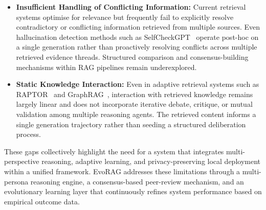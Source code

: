 \begin{itemize}
    \item \textbf{Insufficient Handling of Conflicting Information:}
    Current retrieval systems optimise for relevance but frequently fail to explicitly
    resolve contradictory or conflicting information retrieved from multiple sources.
    Even hallucination detection methods such as SelfCheckGPT~\cite{manakul2023selfcheckgpt}
    operate post-hoc on a single generation rather than proactively resolving conflicts
    across multiple retrieved evidence threads. Structured comparison and
    consensus-building mechanisms within RAG pipelines remain underexplored.

    \item \textbf{Static Knowledge Interaction:}
    Even in adaptive retrieval systems such as RAPTOR~\cite{sarthi2024raptor} and
    GraphRAG~\cite{edge2024graphrag}, interaction with retrieved knowledge remains
    largely linear and does not incorporate iterative debate, critique, or mutual
    validation among multiple reasoning agents. The retrieved content informs a single
    generation trajectory rather than seeding a structured deliberation process.

\end{itemize}

These gaps collectively highlight the need for a system that integrates multi-perspective
reasoning, adaptive learning, and privacy-preserving local deployment within a unified
framework. EvoRAG addresses these limitations through a multi-persona reasoning engine,
a consensus-based peer-review mechanism, and an evolutionary learning layer that
continuously refines system performance based on empirical outcome data.